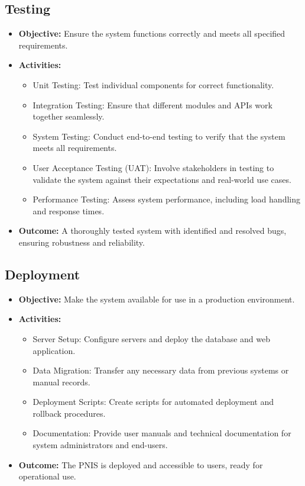 \subsection{Testing}
\begin{itemize}
    \item \textbf{Objective:} Ensure the system functions correctly and meets all specified requirements.
    \item \textbf{Activities:}
        \begin{itemize}
            \item Unit Testing: Test individual components for correct functionality.
            \item Integration Testing: Ensure that different modules and APIs work together seamlessly.
            \item System Testing: Conduct end-to-end testing to verify that the system meets all requirements.
            \item User Acceptance Testing (UAT): Involve stakeholders in testing to validate the system against their expectations and real-world use cases.
            \item Performance Testing: Assess system performance, including load handling and response times.
        \end{itemize}
    \item \textbf{Outcome:} A thoroughly tested system with identified and resolved bugs, ensuring robustness and reliability.
\end{itemize}

\subsection{Deployment}
\begin{itemize}
    \item \textbf{Objective:} Make the system available for use in a production environment.
    \item \textbf{Activities:}
        \begin{itemize}
            \item Server Setup: Configure servers and deploy the database and web application.
            \item Data Migration: Transfer any necessary data from previous systems or manual records.
            \item Deployment Scripts: Create scripts for automated deployment and rollback procedures.
            \item Documentation: Provide user manuals and technical documentation for system administrators and end-users.
        \end{itemize}
    \item \textbf{Outcome:} The PNIS is deployed and accessible to users, ready for operational use.
\end{itemize}

